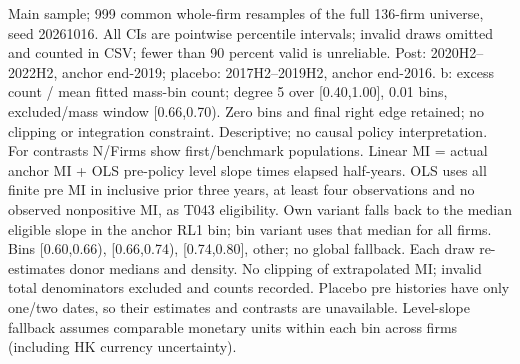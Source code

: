 \begin{threeparttable}
\begin{tablenotes}[flushleft]
\item[] Main sample; 999 common whole-firm resamples of the full 136-firm universe, seed 20261016. All CIs are pointwise percentile intervals; invalid draws omitted and counted in CSV; fewer than 90 percent valid is unreliable. Post: 2020H2--2022H2, anchor end-2019; placebo: 2017H2--2019H2, anchor end-2016. b: excess count / mean fitted mass-bin count; degree 5 over [0.40,1.00], 0.01 bins, excluded/mass window [0.66,0.70). Zero bins and final right edge retained; no clipping or integration constraint. Descriptive; no causal policy interpretation. For contrasts N/Firms show first/benchmark populations. Linear MI = actual anchor MI + OLS pre-policy level slope times elapsed half-years. OLS uses all finite pre MI in inclusive prior three years, at least four observations and no observed nonpositive MI, as T043 eligibility. Own variant falls back to the median eligible slope in the anchor RL1 bin; bin variant uses that median for all firms. Bins [0.60,0.66), [0.66,0.74), [0.74,0.80], other; no global fallback. Each draw re-estimates donor medians and density. No clipping of extrapolated MI; invalid total denominators excluded and counts recorded. Placebo pre histories have only one/two dates, so their estimates and contrasts are unavailable. Level-slope fallback assumes comparable monetary units within each bin across firms (including HK currency uncertainty).
\end{tablenotes}
\end{threeparttable}
\endgroup
\par\medskip
\begingroup\scriptsize\setlength{\tabcolsep}{3pt}
